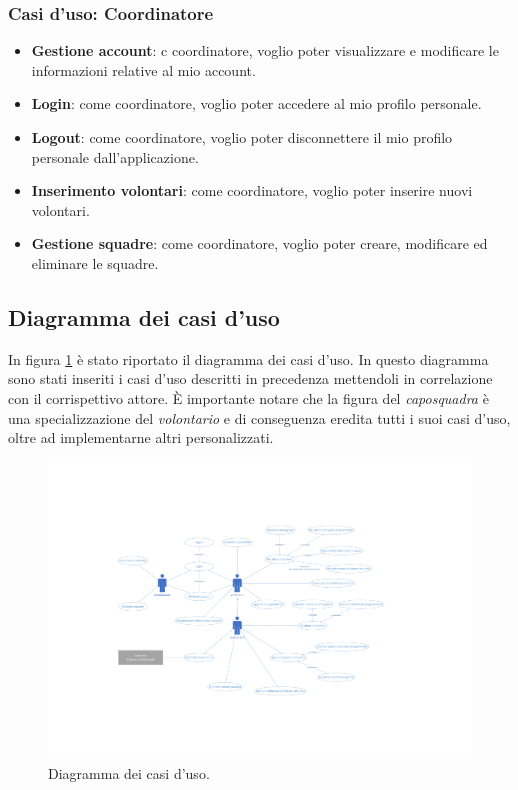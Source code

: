 \subsubsection{Casi d'uso: Coordinatore}
\begin{itemize}
	\item \textbf{Gestione account}:
	c coordinatore, voglio poter visualizzare e modificare le informazioni relative al mio account.
	
	\item \textbf{Login}:
	come coordinatore, voglio poter accedere al mio profilo personale.
	
	\item \textbf{Logout}:
	come coordinatore, voglio poter disconnettere il mio profilo personale dall'applicazione.
	
	\item \textbf{Inserimento volontari}:
	come coordinatore, voglio poter inserire nuovi volontari.
	
	\item \textbf{Gestione squadre}:
	come coordinatore, voglio poter creare, modificare ed eliminare le squadre.
\end{itemize}


\clearpage
\subsection{Diagramma dei casi d'uso}
In figura \ref{fig:UseCaseDiagram} è stato riportato il diagramma dei casi d'uso. In questo diagramma sono stati inseriti i casi d'uso descritti in precedenza mettendoli in correlazione con il corrispettivo attore. È importante notare che la figura del \textit{caposquadra} è una specializzazione del \textit{volontario} e di conseguenza eredita tutti i suoi casi d'uso, oltre ad implementarne altri personalizzati. 

\begin{figure}
	\centering
	\includegraphics[width=0.9\linewidth]{OtherFiles/Use cases diagram}
	\caption{Diagramma dei casi d'uso.}
	\label{fig:UseCaseDiagram}
\end{figure}


